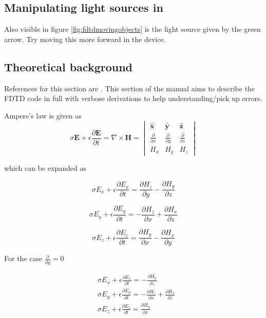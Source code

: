 \subsection{Manipulating light sources in \simname}
 Also visible in figure \ref{fig:fdtdmovingobjects} is the light source given by the green arrow. Try moving this more forward in the device.

\subsection{Theoretical background}
References for this section are \cite{FDTD_Schneider}. This section of the manual aims to describe the FDTD code in full with verbose derivations to help understanding/pick up errors.

Ampere’s law is given as  \cite{FDTD_Schneider}
\begin{equation}
\sigma  \boldsymbol{E} + \epsilon \frac{\partial  \boldsymbol{E}}{\partial t} = \nabla \times \boldsymbol{H} =
\begin{vmatrix} \hat{\boldsymbol{x}} & \hat{\boldsymbol{y}} & \hat{\boldsymbol{z}} \\ 
\frac{\partial}{\partial x} & \frac{\partial}{\partial y} & \frac{\partial}{\partial z} \\ 
H_{x} & H_{y} & H_{z}
\end{vmatrix}
\end{equation}


which can be expanded as

\begin{equation}
\sigma  E_{x} + \epsilon \frac{\partial  E_{x}}{\partial t} = \frac{\partial  H_{z}}{\partial y}-\frac{\partial  H_{y}}{\partial z}
\end{equation}

\begin{equation}
\sigma  E_{y} + \epsilon \frac{\partial  E_{y}}{\partial t} = -\frac{\partial  H_{z}}{\partial x}+\frac{\partial  H_{x}}{\partial z}
\end{equation}

\begin{equation}
\sigma  E_{z} + \epsilon \frac{\partial  E_{z}}{\partial t} = \frac{\partial  H_{y}}{\partial x}-\frac{\partial  H_{x}}{\partial y}
\end{equation}


For the case $\frac{\partial}{\partial y}=0$

\begin{equation}
\begin{split}
&\sigma  E_{x} + \epsilon \frac{\partial  E_{x}}{\partial t} =-\frac{\partial  H_{y}}{\partial z}\\
&\sigma  E_{y} + \epsilon \frac{\partial  E_{y}}{\partial t} = -\frac{\partial  H_{z}}{\partial x}+\frac{\partial  H_{x}}{\partial z}\\
&\sigma  E_{z} + \epsilon \frac{\partial  E_{z}}{\partial t} = \frac{\partial  H_{y}}{\partial x}
\end{split}
\end{equation}

